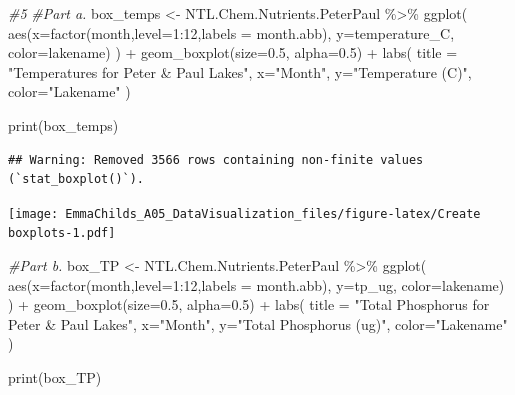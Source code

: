 \documentclass[
]{article}
\newenvironment{Shaded}{\begin{snugshade}}{\end{snugshade}}
\newcommand{\AttributeTok}[1]{\textcolor[rgb]{0.77,0.63,0.00}{#1}}
\newcommand{\CommentTok}[1]{\textcolor[rgb]{0.56,0.35,0.01}{\textit{#1}}}
\newcommand{\DecValTok}[1]{\textcolor[rgb]{0.00,0.00,0.81}{#1}}
\newcommand{\FloatTok}[1]{\textcolor[rgb]{0.00,0.00,0.81}{#1}}
\newcommand{\FunctionTok}[1]{\textcolor[rgb]{0.00,0.00,0.00}{#1}}
\newcommand{\NormalTok}[1]{#1}
\newcommand{\OtherTok}[1]{\textcolor[rgb]{0.56,0.35,0.01}{#1}}
\newcommand{\SpecialCharTok}[1]{\textcolor[rgb]{0.00,0.00,0.00}{#1}}
\newcommand{\StringTok}[1]{\textcolor[rgb]{0.31,0.60,0.02}{#1}}
\begin{document}
\begin{Shaded}
\begin{Highlighting}[]
\CommentTok{\#5 }
\CommentTok{\#Part a.}
\NormalTok{box\_temps }\OtherTok{\textless{}{-}}\NormalTok{ NTL.Chem.Nutrients.PeterPaul }\SpecialCharTok{\%\textgreater{}\%}
  \FunctionTok{ggplot}\NormalTok{(}
    \FunctionTok{aes}\NormalTok{(}\AttributeTok{x=}\FunctionTok{factor}\NormalTok{(month,}\AttributeTok{level=}\DecValTok{1}\SpecialCharTok{:}\DecValTok{12}\NormalTok{,}\AttributeTok{labels =}\NormalTok{ month.abb),}
      \AttributeTok{y=}\NormalTok{temperature\_C,}
      \AttributeTok{color=}\NormalTok{lakename)}
\NormalTok{  ) }\SpecialCharTok{+} 
  \FunctionTok{geom\_boxplot}\NormalTok{(}\AttributeTok{size=}\FloatTok{0.5}\NormalTok{, }\AttributeTok{alpha=}\FloatTok{0.5}\NormalTok{) }\SpecialCharTok{+}
    \FunctionTok{labs}\NormalTok{(}
      \AttributeTok{title =} \StringTok{"Temperatures for Peter \& Paul Lakes"}\NormalTok{,}
      \AttributeTok{x=}\StringTok{"Month"}\NormalTok{,}
      \AttributeTok{y=}\StringTok{"Temperature (C)"}\NormalTok{, }
      \AttributeTok{color=}\StringTok{"Lakename"}
\NormalTok{    ) }

\FunctionTok{print}\NormalTok{(box\_temps)}
\end{Highlighting}
\end{Shaded}

\begin{verbatim}
## Warning: Removed 3566 rows containing non-finite values (`stat_boxplot()`).
\end{verbatim}

\texttt{[image: EmmaChilds\_A05\_DataVisualization\_files/figure-latex/Create boxplots-1.pdf]}

\begin{Shaded}
\begin{Highlighting}[]
\CommentTok{\#Part b.}
\NormalTok{box\_TP }\OtherTok{\textless{}{-}}\NormalTok{ NTL.Chem.Nutrients.PeterPaul }\SpecialCharTok{\%\textgreater{}\%}
  \FunctionTok{ggplot}\NormalTok{(}
    \FunctionTok{aes}\NormalTok{(}\AttributeTok{x=}\FunctionTok{factor}\NormalTok{(month,}\AttributeTok{level=}\DecValTok{1}\SpecialCharTok{:}\DecValTok{12}\NormalTok{,}\AttributeTok{labels =}\NormalTok{ month.abb),}
      \AttributeTok{y=}\NormalTok{tp\_ug,}
      \AttributeTok{color=}\NormalTok{lakename)}
\NormalTok{  ) }\SpecialCharTok{+} 
  \FunctionTok{geom\_boxplot}\NormalTok{(}\AttributeTok{size=}\FloatTok{0.5}\NormalTok{, }\AttributeTok{alpha=}\FloatTok{0.5}\NormalTok{) }\SpecialCharTok{+}
    \FunctionTok{labs}\NormalTok{(}
      \AttributeTok{title =} \StringTok{"Total Phosphorus for Peter \& Paul Lakes"}\NormalTok{,}
      \AttributeTok{x=}\StringTok{"Month"}\NormalTok{,}
      \AttributeTok{y=}\StringTok{"Total Phosphorus (ug)"}\NormalTok{, }
      \AttributeTok{color=}\StringTok{"Lakename"}
\NormalTok{    ) }

\FunctionTok{print}\NormalTok{(box\_TP)}
\end{Highlighting}
\end{Shaded}
\end{document}
